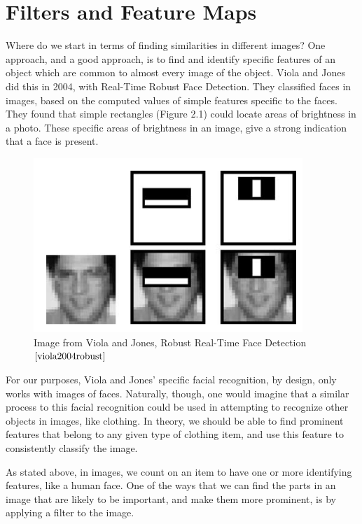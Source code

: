 \documentclass[12pt]{report} %
\begin{document}
 \chapter{Filters and Feature Maps}

	Where do we start in terms of finding similarities in different images? One approach, and a good approach, is to find and identify specific features of an object which are common to almost every image of the object. Viola and Jones did this in 2004, with Real-Time Robust Face Detection. They classified faces in images, based on the computed values of simple features specific to the faces\cite{viola2004robust}. They found that simple rectangles (Figure 2.1) could locate areas of brightness in a photo. These specific areas of brightness in an image,  give a strong indication that a face is present.

\begin{figure}
\centering
\includegraphics[width=4in]{ViolaJonesFace} 
\caption{Image from Viola and Jones, Robust Real-Time Face Detection$\cite{viola2004robust}$}
\label{fig: Face Detection Rectangles}
\end{figure}

	For our purposes, Viola and Jones' specific facial recognition, by design, only works with images of faces. Naturally, though, one would imagine that a similar process to this facial recognition could be used in attempting to recognize other objects in images, like clothing. In theory, we should be able to find prominent features that belong to any given type of clothing item, and use this feature to consistently classify the image.
		
	 As stated above, in images, we count on an item to have one or more identifying features, like a human face. One of the ways that we can find the parts in an image that are likely to be important, and make them more prominent, is by applying a filter to the image. 
\end{document}
